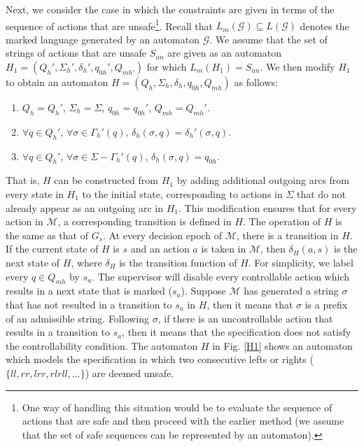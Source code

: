 \documentclass[letterpaper, 10 pt, conference]{ieeeconf}
\begin{document}
Next, we consider the case in which the constraints are given in terms of the sequence of actions that are unsafe\footnote{One way of handling this situation would be to evaluate the sequence of actions that are safe and then proceed with the earlier method (we assume that the set of safe sequences can be represented by an automaton).}. Recall that $L_m(\mathcal{G}) \subseteq L(\mathcal{G})$ denotes the marked language generated by an automaton $\mathcal{G}$. We assume that the set of strings of actions that are unsafe $S_{un}$ are given as an automaton $H_1 = (Q_{h}',\Sigma_h', \delta_h', q_{0h}', Q_{mh'})$ for which $L_m(H_1) = S_{un}$. We then modify $H_1$ to obtain an automaton $H=(Q_{h},\Sigma_h, \delta_h, q_{0h}, Q_{mh})$ as follows: 
\begin{enumerate}
    \item $Q_h = Q_h'$, $\Sigma_h  = \Sigma$,  $q_{0h} = q_{0h}'$, $Q_{mh}  = Q_{mh}'$.
    \item $\forall q \in Q_h'$, $\forall \sigma \in \Gamma_h'(q)$, $\delta_h(\sigma, q)  = \delta_h'(\sigma, q)$.
    \item $\forall q \in Q_h'$, $\forall \sigma \in \Sigma - \Gamma_h'(q)$, $\delta_h(\sigma, q) = q_{0h}$.
\end{enumerate}
That is, $H$ can be constructed from $H_1$ by adding additional outgoing arcs from every state in $H_1$ to the initial state, corresponding to actions in $\Sigma$ that do not already appear as an outgoing arc in $H_1$. This modification ensures that for every action in $\mathcal{M}$, a corresponding transition is defined in $H$. The operation of $H$ is the same as that of $G_s$. At every decision epoch of $\mathcal{M}$, there is a transition in $H$. If the current state of $H$ is $s$ and an action $a$ is taken in $\mathcal{M}$, then $\delta_H(a, s)$ is the next state of $H$, where $\delta_H$ is the transition function of $H$. %
For simplicity, we label every $q \in Q_{mh}$ by $s_a$. The supervisor will disable every controllable action which results in a next state that is marked ($s_a$). Suppose $\mathcal{M}$ has generated a string $\sigma$ that has not resulted in a transition to $s_a$ in $H$, then it means that $\sigma$ is a prefix of an admissible string. Following $\sigma$, if there is an uncontrollable action that results in a transition to $s_a$, then it means that the specification does not satisfy the controllability condition. %
The automaton $H$ in Fig. \ref{H1} shows an automaton which models the specification in which two consecutive lefts or rights ($\{ll, rr, lrr, rlrll,\hdots\}$) are deemed unsafe. 
\end{document}
